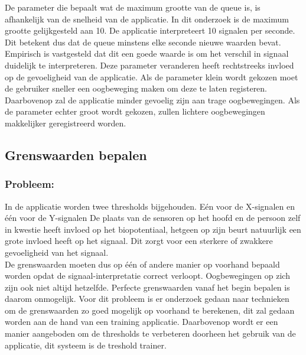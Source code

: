 \documentclass{article}
\begin{document}
De parameter die bepaalt wat de maximum grootte van de queue is, is afhankelijk van de snelheid van de applicatie. In dit onderzoek is de maximum grootte gelijkgesteld aan 10. De applicatie interpreteert 10 signalen per seconde. Dit betekent dus dat de queue minstens elke seconde nieuwe waarden bevat. Empirisch is vastgesteld dat dit een goede waarde is om het verschil in signaal duidelijk te interpreteren. Deze parameter veranderen heeft rechtstreeks invloed op de gevoeligheid van de applicatie. Als de parameter klein wordt gekozen moet de gebruiker sneller een oogbeweging maken om deze te laten registeren. Daarbovenop zal de applicatie minder gevoelig zijn aan trage oogbewegingen. Als de parameter echter groot wordt gekozen, zullen lichtere oogbewegingen makkelijker geregistreerd worden.

\subsection{Grenswaarden bepalen}
\subsubsection{Probleem:}
In de applicatie worden twee thresholds bijgehouden. E\'en voor de X-signalen en \'e\'en voor de Y-signalen
De plaats van de sensoren op het hoofd en de persoon zelf in kwestie heeft invloed op het biopotentiaal, hetgeen op zijn beurt natuurlijk een grote invloed heeft op het signaal. Dit zorgt voor een sterkere of zwakkere gevoeligheid van het signaal.\\
De grenswaarden moeten dus op \'e\'en of andere manier op voorhand bepaald worden opdat de signaal-interpretatie correct verloopt. Oogbewegingen op zich zijn ook niet altijd hetzelfde. Perfecte grenswaarden vanaf het begin bepalen is daarom onmogelijk. Voor dit probleem is er onderzoek gedaan naar technieken om de grenswaarden zo goed mogelijk op voorhand te berekenen, dit zal gedaan worden aan de hand van een training applicatie. Daarbovenop wordt er een manier aangeboden om de thresholds te verbeteren doorheen het gebruik van de applicatie, dit systeem is de treshold trainer.
\end{document}

